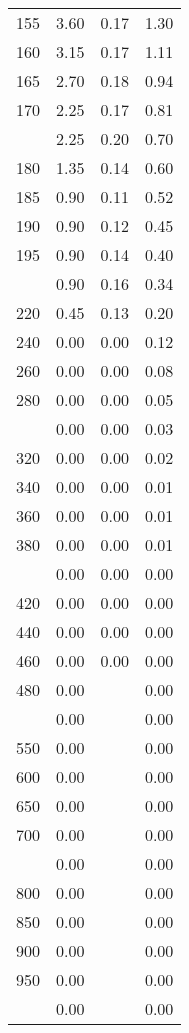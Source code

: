 \begin{table}[ht]
\begin{tabular}{lccc}
  155 & 3.60 & 0.17 & 1.30 \\ 
  160 & 3.15 & 0.17 & 1.11 \\ 
  165 & 2.70 & 0.18 & 0.94 \\ 
  170 & 2.25 & 0.17 & 0.81 \\ 
   \addlinespace
175 & 2.25 & 0.20 & 0.70 \\ 
  180 & 1.35 & 0.14 & 0.60 \\ 
  185 & 0.90 & 0.11 & 0.52 \\ 
  190 & 0.90 & 0.12 & 0.45 \\ 
  195 & 0.90 & 0.14 & 0.40 \\ 
   \addlinespace
200 & 0.90 & 0.16 & 0.34 \\ 
  220 & 0.45 & 0.13 & 0.20 \\ 
  240 & 0.00 & 0.00 & 0.12 \\ 
  260 & 0.00 & 0.00 & 0.08 \\ 
  280 & 0.00 & 0.00 & 0.05 \\ 
   \addlinespace
300 & 0.00 & 0.00 & 0.03 \\ 
  320 & 0.00 & 0.00 & 0.02 \\ 
  340 & 0.00 & 0.00 & 0.01 \\ 
  360 & 0.00 & 0.00 & 0.01 \\ 
  380 & 0.00 & 0.00 & 0.01 \\ 
   \addlinespace
400 & 0.00 & 0.00 & 0.00 \\ 
  420 & 0.00 & 0.00 & 0.00 \\ 
  440 & 0.00 & 0.00 & 0.00 \\ 
  460 & 0.00 & 0.00 & 0.00 \\ 
  480 & 0.00 &  & 0.00 \\ 
   \addlinespace
500 & 0.00 &  & 0.00 \\ 
  550 & 0.00 &  & 0.00 \\ 
  600 & 0.00 &  & 0.00 \\ 
  650 & 0.00 &  & 0.00 \\ 
  700 & 0.00 &  & 0.00 \\ 
   \addlinespace
750 & 0.00 &  & 0.00 \\ 
  800 & 0.00 &  & 0.00 \\ 
  850 & 0.00 &  & 0.00 \\ 
  900 & 0.00 &  & 0.00 \\ 
  950 & 0.00 &  & 0.00 \\ 
   \addlinespace
1000 & 0.00 &  & 0.00 \\ 
   \bottomrule
\end{tabular}
\end{table}
